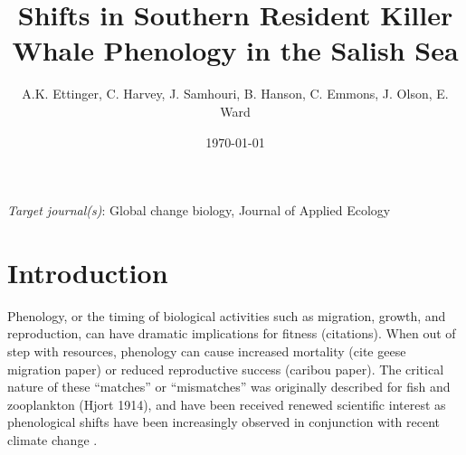 \documentclass{article}
\begin{document}

\title{Shifts in Southern Resident Killer Whale Phenology in the Salish Sea}
\date{\today}
\maketitle
\author{A.K. Ettinger, C. Harvey, J. Samhouri, B. Hanson, C. Emmons, J. Olson, E. Ward}
\maketitle  %
\par 
\emph{Target journal(s)}: Global change biology, Journal of Applied Ecology %
\section* {Introduction}
\par Phenology, or the timing of biological activities such as migration, growth, and reproduction, can have dramatic implications for fitness (citations). When out of step with resources, phenology can cause increased mortality (cite geese migration paper) or reduced reproductive success (caribou paper). The critical nature of these ``matches'' or  ``mismatches'' was originally described for fish and zooplankton (Hjort 1914), and have been received renewed scientific interest as phenological shifts have been increasingly observed in conjunction with recent climate change \citep{durant2007}. 
\end{document}
